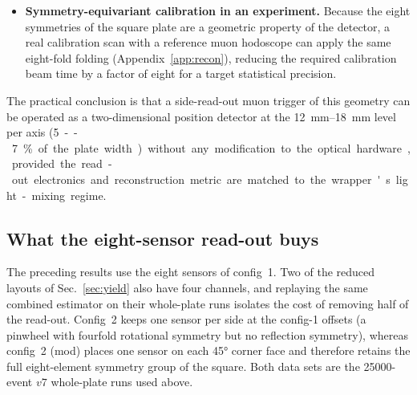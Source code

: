 \documentclass[11pt,a4paper]{article}
\begin{document}
\begin{itemize}
        crosstalk, gain spread or front-end time jitter, and the PDE is applied
        exactly as tabulated.  The reported resolutions therefore represent the
        fundamental optical limit of the config-1 geometry.
  \item \textbf{Symmetry-equivariant calibration in an experiment.}  Because the
        eight symmetries of the square plate are a geometric property of the
        detector, a real calibration scan with a reference muon hodoscope can
        apply the same eight-fold folding (Appendix~\ref{app:recon}), reducing
        the required calibration beam time by a factor of eight for a target
        statistical precision.
\end{itemize}

The practical conclusion is that a side-read-out muon trigger of this
geometry can be operated as a two-dimensional position detector at the
\SIrange{12}{18}{\milli\meter} level per axis (\SI{5}--\SI{7}{\percent} of the
plate width) without any modification to the optical hardware, provided the
read-out electronics and reconstruction metric are matched to the wrapper's
light-mixing regime.

\subsection{What the eight-sensor read-out buys}
\label{sec:recon-layouts}

The preceding results use the eight sensors of config~1.  Two of the reduced
layouts of Sec.~\ref{sec:yield} also have four channels, and replaying the same
combined estimator on their whole-plate runs isolates the cost of removing
half of the read-out.  Config~2 keeps one sensor per side at the config-1
offsets (a pinwheel with fourfold rotational symmetry but no reflection
symmetry), whereas config~2 (mod) places one sensor on each \ang{45} corner
face and therefore retains the full eight-element symmetry group of the
square.  Both data sets are the \num{25000}-event $v7$ whole-plate runs used
above.
\end{document}
